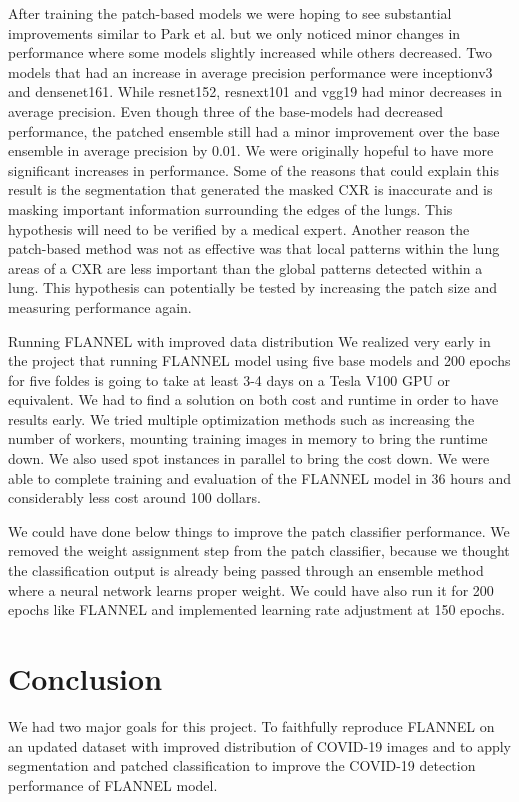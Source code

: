 \documentclass{sigkddExp}
\begin{document}
After training the patch-based models we were hoping to see substantial
improvements similar to Park et al. but we only noticed minor changes in
performance where some models slightly increased while others decreased. Two
models that had an increase in average precision performance were inceptionv3
and densenet161. While resnet152, resnext101 and vgg19 had minor decreases in
average precision. Even though three of the base-models had decreased
performance, the patched ensemble still had a minor improvement over the base
ensemble in average precision by 0.01. We were originally hopeful to have more
significant increases in performance. Some of the reasons that could explain
this result is the segmentation that generated the masked CXR is inaccurate and
is masking important information surrounding the edges of the lungs. This
hypothesis will need to be verified by a medical expert. Another reason the
patch-based method was not as effective was that local patterns within the lung
areas of a CXR are less important than the global patterns detected within a
lung. This hypothesis can potentially be tested by increasing the patch size and
measuring performance again.

Running FLANNEL with improved data distribution We realized very early in the
project that running FLANNEL model using five base models and 200 epochs for
five foldes is going to take at least 3-4 days on a Tesla V100 GPU or
equivalent. We had to find a solution on both cost and runtime in order to have
results early. We tried multiple optimization methods such as increasing the
number of workers, mounting training images in memory to bring the runtime down.
We also used spot instances in parallel to bring the cost down. We were able to
complete training and evaluation of the FLANNEL model in 36 hours and
considerably less cost around 100 dollars.

We could have done below things to improve the patch classifier performance. We
removed the weight assignment step from the patch classifier, because we thought
the classification output is already being passed through an ensemble method
where a neural network learns proper weight. We could have also run it for 200
epochs like FLANNEL and implemented learning rate adjustment at 150 epochs.



\section{Conclusion}
We had two major goals for this project. To faithfully reproduce FLANNEL on an
updated dataset with improved distribution of COVID-19 images and to apply
segmentation and patched classification to improve the COVID-19 detection
performance of FLANNEL model.
\end{document}
